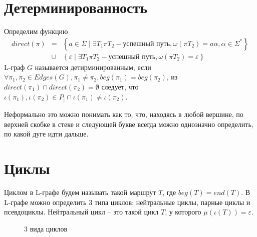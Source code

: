 \section{Детерминированность}
Определим функцию \begin{eqnarray*}
    direct(\pi) & = & \left\{ a \in \Sigma \mid \exists T_1 \pi T_2 - \text{успешный путь}, \omega(\pi T_2) = a \alpha, \alpha \in \Sigma^* \right\} \\
    & \cup & \left\{ \varepsilon \mid \exists T_1 \pi T_2 - \text{успешный путь}, \omega(\pi T_2) = \varepsilon \right\}
\end{eqnarray*}
L-граф $G$ называется детирминированным, если
$\forall \pi_1, \pi_2 \in Edges(G), \pi_1 \neq \pi_2, beg(\pi_1) = beg(\pi_2)$, 
из $direct(\pi_1) \cap direct(\pi_2) = \emptyset$ следует, что 
$\iota(\pi_1), \iota(\pi_2) \in P_] \cap \iota(\pi_1) \neq \iota(\pi_2)$. 

\begin{figure}[h]
    \begin{minipage}[h]{0.49\linewidth}
    \end{minipage}
    \hfill
    \begin{minipage}[h]{0.49\linewidth}
    \end{minipage}
    \label{det_vs_nondet}  
  \end{figure}

Неформально это можно понимать как то, что, находясь в любой вершине, 
по верхней скобке в стеке и следующей букве всегда можно однозначно определить, по какой дуге идти дальше.

\section{Циклы}

Циклом в L-графе будем называть такой маршрут $T$, где $beg(T) = end(T)$. 
В L-графе можно определить 3 типа циклов: нейтральные циклы, парные циклы и псевдоциклы.
Нейтральный цикл -- это такой цикл $T$, у которого $\mu(\iota(T)) = \varepsilon$.

\begin{figure}
    \centering
    \qquad
    \qquad
    \caption{3 вида циклов}
    \label{loop-kinds-example}
\end{figure}


